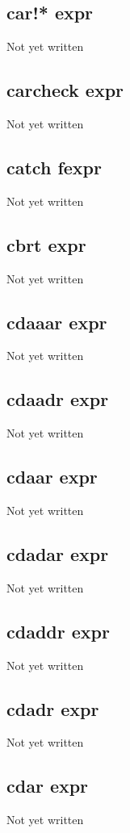 \documentclass[a4paper,11pt]{article}
\begin{document}
\subsection{\ttfamily car!* expr}
Not yet written

\subsection{\ttfamily carcheck expr}
Not yet written

\subsection{\ttfamily catch fexpr}
Not yet written

\subsection{\ttfamily cbrt expr}
Not yet written

\subsection{\ttfamily cdaaar expr}
Not yet written

\subsection{\ttfamily cdaadr expr}
Not yet written

\subsection{\ttfamily cdaar expr}
Not yet written

\subsection{\ttfamily cdadar expr}
Not yet written

\subsection{\ttfamily cdaddr expr}
Not yet written

\subsection{\ttfamily cdadr expr}
Not yet written

\subsection{\ttfamily cdar expr}
Not yet written
\end{document}
